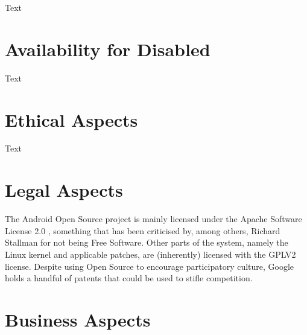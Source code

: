 \documentclass[conference]{IEEEtran}
\begin{document}
{Text}


\section{Availability for Disabled}
\label{availability}

{Text}


\section{Ethical Aspects}
\label{ethics}

{Text}


\section{Legal Aspects}
\label{legal}

{The Android Open Source project is mainly licensed under the Apache Software License 2.0 \cite{apache-license}, something that has been criticised by, among others, Richard Stallman for not being Free Software\cite{rms-android}. Other parts of the system, namely the Linux kernel and applicable patches, are (inherently) licensed with the GPLV2 license\cite{gplv2}\cite{android-licenses}. Despite using Open Source to encourage participatory culture, Google holds a handful of patents that could be used to stifle competition\cite{google-slide-unlock}\cite{google-radial-menu}}.

\section{Business Aspects}
\label{financial}
\end{document}
